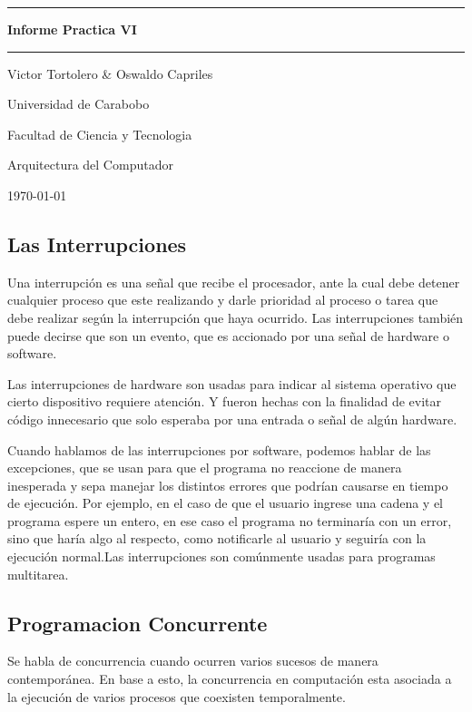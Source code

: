 \documentclass{article}
\begin{document}
\begin{centering}
\hrule 	\vspace{0.4cm}
	{ \Huge \bfseries Informe Practica VI \\[0.4cm] }
\hrule \vfill
\end{centering}

\noindent
\centerline{Victor Tortolero \& Oswaldo Capriles} \newline

\vspace{8cm}
\centerline{Universidad de Carabobo}
\centerline{Facultad de Ciencia y Tecnologia}
\centerline{Arquitectura del Computador}
\centerline{\today}

\newpage


\flushleft
\setlength{\parindent}{20pt}

\begin{centering} \section{Las Interrupciones} \end{centering}
	Una interrupción es una señal que recibe el procesador, ante la cual debe detener cualquier proceso que este realizando y darle prioridad al proceso o tarea que debe realizar según la interrupción que haya ocurrido. Las interrupciones también puede decirse que son un evento, que es accionado por una señal de hardware o software. 
	
	Las interrupciones de hardware son usadas para indicar al sistema operativo que cierto dispositivo requiere atención. Y fueron hechas con la finalidad de evitar código innecesario que solo esperaba por una entrada o señal de algún hardware.
	
	Cuando hablamos de las interrupciones por software, podemos hablar de las excepciones, que se usan para que el programa no reaccione de manera inesperada y sepa manejar los distintos errores que podrían causarse en tiempo de ejecución. Por ejemplo, en el caso de que el usuario ingrese una cadena y el programa espere un entero, en ese caso el programa no terminaría con un error, sino que haría algo al respecto, como notificarle al usuario y seguiría con la ejecución normal.Las interrupciones son comúnmente usadas para programas multitarea.
\newpage
	
	
\begin{centering} \section{Programacion Concurrente} \end{centering}
	Se habla de concurrencia cuando ocurren varios sucesos de manera contemporánea.
	En base a esto, la concurrencia en computación esta asociada a la ejecución de varios procesos que coexisten temporalmente.
	
\end{document}
